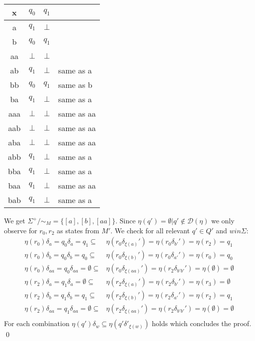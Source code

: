 \documentclass[a4paper,12pt,numbers=noenddot]{scrreport}
\begin{document}
\begin{center}
\begin{tabular}{c|cc|l}
    x & $q_{0}$ & $q_{1}$ & \\ \hline
    a & $q_1$ & $\bot$ & \\ 
    b & $q_0$ & $q_1$ & \\ \hline
    aa & $\bot$ & $\bot$ & \\
    ab & $q_1$ & $\bot$ & same as a\\
    bb & $q_0$ & $q_1$ & same as b\\ 
    ba & $q_1$ & $\bot$ & same as a \\ \hline
    aaa & $\bot$ & $\bot$ & same as aa \\
    aab & $\bot$ & $\bot$ & same as aa \\
    aba & $\bot$ & $\bot$ & same as aa \\
    abb & $q_1$ & $\bot$ & same as a \\ 
    bba & $q_1$ & $\bot$ & same as a \\ 
    baa & $q_1$ & $\bot$ & same as aa \\ 
    bab & $q_1$ & $\bot$ & same as a \\ 
\end{tabular}
\end{center}
We get $\Sigma^+ / \sim_M = \{[a], [b], [aa]\}$.
Since $\eta(q') = \emptyset | q' \notin \mathcal{D}(\eta)$ we only observe for $r_0, r_2$ as states from $M'$.
We check for all relevant $q' \in Q'$ and $w in \Sigma$:
\begin{align*}
\eta(r_0)\delta_a = q_0\delta_a = q_1 \subseteq & \eta(r_0\delta_{\xi(a)}') = \eta(r_0\delta_{b'}') = \eta(r_2) = q_1 \\
\eta(r_0)\delta_b = q_0\delta_b = q_0 \subseteq & \eta(r_0\delta_{\xi(b)}') = \eta(r_0\delta_{a'}') = \eta(r_0) = q_0 \\
\eta(r_0)\delta_{aa} = q_0\delta_{aa} = \emptyset \subseteq & \eta(r_0\delta_{\xi(aa)}') = \eta(r_2\delta_{b'b'}') = \eta(\emptyset) = \emptyset \\
\eta(r_2)\delta_a = q_1\delta_a = \emptyset \subseteq & \eta(r_2\delta_{\xi(a)}') = \eta(r_2\delta_{b'}') = \eta(r_3) = \emptyset \\
\eta(r_2)\delta_b = q_1\delta_b = q_1 \subseteq & \eta(r_2\delta_{\xi(b)}') = \eta(r_2\delta_{a'}') = \eta(r_2) = q_1 \\
\eta(r_2)\delta_{aa} = q_1\delta_{aa} = \emptyset \subseteq & \eta(r_2\delta_{\xi(aa)}')  = \eta(r_2\delta_{b'b'}') = \eta(\emptyset) = \emptyset\\
\end{align*}
For each combination $\eta(q')\delta_w \subseteq \eta(q'\delta'_{\xi(w)})$ holds which concludes the proof.
\qed
\end{document}
